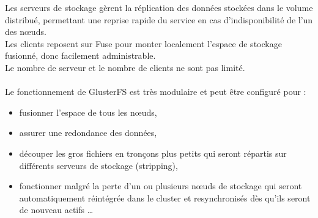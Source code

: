 \documentclass[12pt]{report}
\begin{document}
Les serveurs de stockage gèrent la réplication des données stockées dans le volume distribué, permettant une reprise rapide du service en cas d'indisponibilité de l'un des n\oe uds. \\
Les clients reposent sur Fuse pour monter localement l'espace de stockage fusionné, donc facilement administrable.\\
Le nombre de serveur et le nombre de clients ne sont pas limité.\\\\
Le fonctionnement de GlusterFS est très modulaire et peut être configuré pour :\\
	\begin{itemize}
		\item fusionner l'espace de tous les nœuds,
		\item assurer une redondance des données,
		\item découper les gros fichiers en tronçons plus petits qui seront répartis sur différents serveurs de stockage (stripping),
		\item fonctionner malgré la perte d'un ou plusieurs nœuds de stockage qui seront automatiquement réintégrée dans le cluster et resynchronisés dès qu'ils seront de nouveau actifs \dots \\
	\end{itemize}
\newpage
\end{document}
